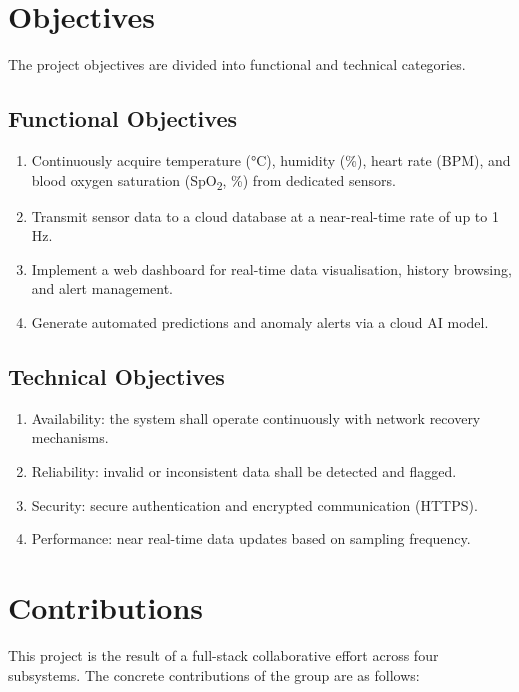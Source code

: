 \section{Objectives}

The project objectives are divided into functional and technical categories.

\subsection*{Functional Objectives}

\begin{enumerate}
	\item Continuously acquire temperature (°C), humidity (\%), heart rate (BPM), and
	      blood oxygen saturation (SpO\textsubscript{2}, \%) from dedicated sensors.
	\item Transmit sensor data to a cloud database at a near-real-time rate of up to 1\,Hz.
	\item Implement a web dashboard for real-time data visualisation, history browsing,
	      and alert management.
	\item Generate automated predictions and anomaly alerts via a cloud AI model.
\end{enumerate}

\subsection*{Technical Objectives}

\begin{enumerate}
	\item Availability: the system shall operate continuously with network recovery mechanisms.
	\item Reliability: invalid or inconsistent data shall be detected and flagged.
	\item Security: secure authentication and encrypted communication (HTTPS).
	\item Performance: near real-time data updates based on sampling frequency.
\end{enumerate}

\section{Contributions}

This project is the result of a full-stack collaborative effort across four subsystems.
The concrete contributions of the group are as follows:

